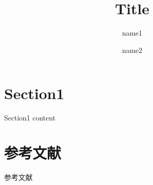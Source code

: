 \title[title for sidebar]{\color{black} \LARGE Title}
\author[name1 \and name2]{name1 \and name2}
\date{}
\begin{frame}{}
\titlepage
\end{frame}
\normalsize

\section{Section1}
\begin{frame}[t]{Section1}
    content
\end{frame}


\section{参考文献}
\begin{frame}[t]{参考文献}
  \footnotesize

  
  
\end{frame}



